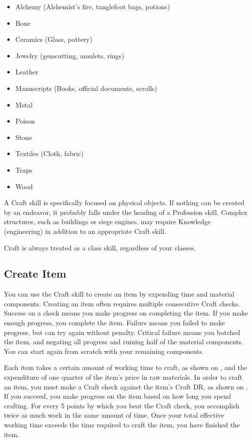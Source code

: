         \begin{itemize}
            \item Alchemy (Alchemist's fire, tanglefoot bags, potions)
            \item Bone
            \item Ceramics (Glass, pottery)
            \item Jewelry (gemcutting, amulets, rings)
            \item Leather
            \item Manuscripts (Books, official documents, scrolls)
            \item Metal
            \item Poison
            \item Stone
            \item Textiles (Cloth, fabric)
            \item Traps
            \item Wood
        \end{itemize}

        A Craft skill is specifically focused on physical objects. If nothing can be created by an endeavor, it probably falls under the heading of a Profession skill. Complex structures, such as buildings or siege engines, may require Knowledge (engineering) in addition to an appropriate Craft skill.

        Craft is always treated as a class skill, regardless of your classes.

    \subsection{Create Item}
        You can use the Craft skill to create an item by expending time and material components. Creating an item often requires multiple consecutive Craft checks. Success on a check means you make progress on completing the item. If you make enough progress, you complete the item. Failure means you failed to make progress, but can try again without penalty. Critical failure means you botched the item, and negating all progress and ruining half of the material components. You can start again from scratch with your remaining components.

        Each item takes a certain amount of working time to craft, as shown on , and the expenditure of one quarter of the item's price in raw materials. In order to craft an item, you must make a Craft check against the item's Craft DR, as shown on . If you succeed, you make progress on the item based on how long you spend crafting. For every 5 points by which you beat the Craft check, you accomplish twice as much work in the same amount of time. Once your total effective working time exceeds the time required to craft the item, you have finished the item.

